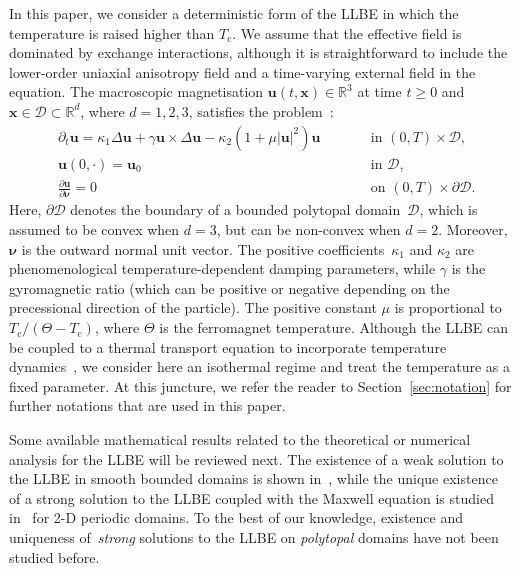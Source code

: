 \documentclass[11pt,reqno]{amsart}
\theoremstyle{definition}
\numberwithin{equation}{section}
\newcommand{\bff}{\boldsymbol}
\newcommand{\bb}{\mathbb}
\newcommand{\pa}{\partial}
\begin{document}
In this paper, we consider a deterministic form of the LLBE 
in which the temperature is {raised higher than $T_{\text{c}}$}. We assume that the effective field is dominated by exchange interactions, although it is straightforward to include the lower-order uniaxial anisotropy field and a time-varying external field in the equation.
The macroscopic magnetisation $\bff{u}(t,\bff{x})\in\bb{R}^3$ at time $t\geq 0$ and
$\bff{x}\in \mathscr{D}\subset \bb{R}^d$, where $d=1,2,3$, satisfies the
problem~\citep{ChuNowChaGar06, Le16}:
\begin{subequations}\label{equ:LLB pro}
\begin{alignat}{2}
&\partial_t \bff{u} 
= 
\kappa_1\Delta\bff{u}
+
\gamma\bff{u}\times  \Delta\bff{u}
-
\kappa_2(1+\mu|\bff{u}|^2)\bff{u}
\qquad&
&\text{in } (0,T)\times \mathscr{D},
\label{equ:LLB}
\\
&\bff{u}(0,\cdot)=\bff{u}_0
\qquad&
&\text{in } \mathscr{D},
\label{equ:u ini con}
\\
&\frac{\pa\bff{u}}{\pa\bff{\nu}} = 0
\qquad&
&\text{on } (0,T)\times\pa \mathscr{D}.
\label{equ:u bou con}
\end{alignat}
\end{subequations}
Here, $\partial\mathscr{D}$ denotes the boundary of a bounded polytopal domain~$\mathscr{D}$, which is assumed to be convex when $d=3$, but can be non-convex when $d=2$. Moreover, $\bff{\nu}$ is the outward normal unit vector.
The positive coefficients~$\kappa_1$ and $\kappa_2$ are phenomenological {temperature-dependent} damping
parameters, while $\gamma$ is the gyromagnetic ratio (which can be positive or
negative depending on the precessional direction of the particle). The positive constant
$\mu$ is proportional to $T_\mathrm{c}/(\Theta-T_\mathrm{c})$, {where $\Theta$ is the ferromagnet temperature}. {Although the LLBE can be coupled to a thermal transport equation to incorporate temperature dynamics~\citep{AtxChuWalMan10}, we consider here an isothermal regime and treat the temperature as a fixed parameter}.
At this juncture, we refer the reader to Section~\ref{sec:notation} for further notations that are used in this paper.


Some available mathematical results related to the theoretical or numerical analysis for the LLBE will be reviewed next. The existence of a weak solution to the LLBE in smooth bounded domains is shown in~\citep{Le16}, while the unique existence of a strong solution to the LLBE coupled with the Maxwell equation is studied in~\citep{LiGuoLiu21} for 2-D periodic domains. To the
best of our knowledge, existence and uniqueness of~\emph{strong} solutions to the LLBE on \emph{polytopal} domains have not been studied before.
\end{document}

